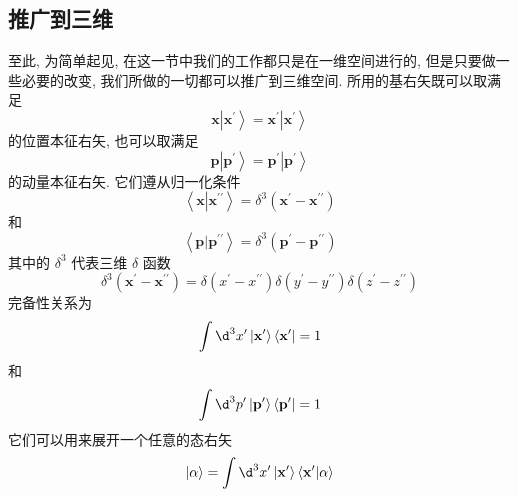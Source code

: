 \documentclass[lang=cn,newtx,10pt,scheme=chinese,thmcnt=section]{elegantbook}
\begin{document}
\subsection*{推广到三维}
至此, 为简单起见, 在这一节中我们的工作都只是在一维空间进行的, 但是只要做一些必要的改变, 我们所做的一切都可以推广到三维空间. 所用的基右矢既可以取满足
\begin{equation}
	\mathbf{x}\left| {\mathbf{x}}^{\prime }\right\rangle = {\mathbf{x}}^{\prime }\left| {\mathbf{x}}^{\prime }\right\rangle
\end{equation}
的位置本征右矢, 也可以取满足
\begin{equation}
	\mathbf{p}\left| {\mathbf{p}}^{\prime }\right\rangle = {\mathbf{p}}^{\prime }\left| {\mathbf{p}}^{\prime }\right\rangle
\end{equation}
的动量本征右矢. 它们遵从归一化条件
\begin{equation}
	\left\langle\mathbf{x}\left| {\mathbf{x}}^{\prime \prime }\right\rangle = {\delta }^{3}\left( {{\mathbf{x}}^{\prime } - {\mathbf{x}}^{\prime \prime }}\right)
\end{equation}
和
\begin{equation}
	\left\langle {\mathbf{p} | {\mathbf{p}}^{\prime \prime }}\right\rangle = {\delta }^{3}\left( {{\mathbf{p}}^{\prime } - {\mathbf{p}}^{\prime \prime }}\right)
\end{equation}
其中的 ${\delta }^{3}$ 代表三维 $\delta$ 函数
\begin{equation}
	{\delta }^{3}\left( {{\mathbf{x}}^{\prime } - {\mathbf{x}}^{\prime \prime }}\right) = \delta \left( {{x}^{\prime } - {x}^{\prime \prime }}\right) \delta \left( {{y}^{\prime } - {y}^{\prime \prime }}\right) \delta \left( {{z}^{\prime } - {z}^{\prime \prime }}\right)
\end{equation}
完备性关系为
\begin{equation}
	\int {\d}^{3}{x}^{\prime }\left| {\mathbf{x}}^{\prime }\right\rangle \left\langle {\mathbf{x}}^{\prime }\right| = 1
\end{equation}
和
\begin{equation}
	\int {\d}^{3}{p}^{\prime }\left| {\mathbf{p}}^{\prime }\right\rangle \left\langle {\mathbf{p}}^{\prime }\right| = 1
\end{equation}
它们可以用来展开一个任意的态右矢
\begin{equation}
	|\alpha \rangle = \int {\d}^{3}{x}^{\prime }\left| {\mathbf{x}}^{\prime }\right\rangle \left\langle {{\mathbf{x}}^{\prime } | \alpha }\right\rangle
\end{equation}
\end{document}
